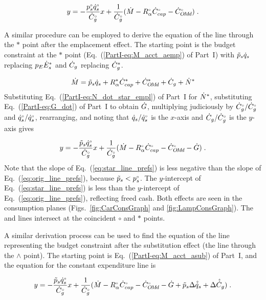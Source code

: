 \begin{equation} \label{eq:orig_line_prefs}
  y = - \frac{{}{p}^{\scriptscriptstyle \circ}_s {}{\dot{q}}^{\scriptscriptstyle \circ}_s}{{}{\dot{C}}^{\scriptscriptstyle \circ}_g} x
         + \frac{1}{{}{\dot{C}}^{\scriptscriptstyle \circ}_g} (\dot{M} - {}{R}^{\scriptscriptstyle \circ}_\alpha {}{\dot{C}}^{\scriptscriptstyle \circ}_{cap} - {}{\dot{C}}^{\scriptscriptstyle \circ}_{O\!M\!d}) \; .
\end{equation}

A similar procedure can be employed to derive the equation of the
\starstar{} line through the $*$ point
after the emplacement effect.
The starting point is the budget constraint at the $*$ point
(Eq.~(\ref{PartI-eq:M_acct_aemp}) of Part~I)
with 
$\tilde{p}_s \dot{q}_s$ replacing $p_E {\dot{E}}^*_s$ and
$\dot{C}_g$ replacing ${\dot{C}}^*_g$.

\begin{equation}
  \dot{M} = \tilde{p}_s \dot{q}_s + {R}^*_\alpha {\dot{C}}^*_{cap} + {\dot{C}}^*_{O\!M\!d} + \dot{C}_g + {\dot{N}}^*
\end{equation}
%
Substituting Eq.~(\ref{PartI-eq:N_dot_star_empl}) of Part~I for ${\dot{N}}^*$,
substituting Eq.~(\ref{PartI-eq:G_dot}) of Part~I to obtain $\dot{G}$,
multiplying judiciously by ${}{\dot{C}}^{\scriptscriptstyle \circ}_g/{}{\dot{C}}^{\scriptscriptstyle \circ}_g$ and ${}{\dot{q}}^{\scriptscriptstyle \circ}_s/{}{\dot{q}}^{\scriptscriptstyle \circ}_s$, 
rearranging, and noting that 
$\dot{q}_s/{}{\dot{q}}^{\scriptscriptstyle \circ}_s$ is the $x$-axis and 
$\dot{C}_g/{}{\dot{C}}^{\scriptscriptstyle \circ}_g$ is the $y$-axis gives

\begin{equation} \label{eq:star_line_prefs}
  y = - \frac{\tilde{p}_s {}{\dot{q}}^{\scriptscriptstyle \circ}_s}{{}{\dot{C}}^{\scriptscriptstyle \circ}_g} x
         + \frac{1}{{}{\dot{C}}^{\scriptscriptstyle \circ}_g} (\dot{M} - {}{R}^{\scriptscriptstyle \circ}_\alpha {}{\dot{C}}^{\scriptscriptstyle \circ}_{cap} - {}{\dot{C}}^{\scriptscriptstyle \circ}_{O\!M\!d} - \dot{G}) \; .
\end{equation}
%
Note that the slope of Eq.~(\ref{eq:star_line_prefs}) is less negative
than the slope of Eq.~(\ref{eq:orig_line_prefs}), 
because $\tilde{p}_s < {}{p}^{\scriptscriptstyle \circ}_s$.
The $y$-intercept of Eq.~(\ref{eq:star_line_prefs}) is less than the 
$y$-intercept of Eq.~(\ref{eq:orig_line_prefs}),
reflecting freed cash.
Both effects are seen in
the consumption planes
(Figs.~\ref{fig:CarConsGraph} and \ref{fig:LampConsGraph}).
The \circcirc{} and \starstar{} lines intersect at the coincident $\circ$ and $*$ points.

A similar derivation process can be used to find the equation of 
the line representing the budget constraint
after the substitution effect (the \hathat{} line through the $\wedge$ point).
The starting point is Eq.~(\ref{PartI-eq:M_acct_asub}) of Part~I, and 
the equation for the constant expenditure line is

\begin{equation} \label{eq:hat_line_prefs}
  y = - \frac{\tilde{p}_s {}{\dot{q}}^{\scriptscriptstyle \circ}_s}{{}{\dot{C}}^{\scriptscriptstyle \circ}_g} x
         + \frac{1}{{}{\dot{C}}^{\scriptscriptstyle \circ}_g} (\dot{M} - {}{R}^{\scriptscriptstyle \circ}_\alpha {}{\dot{C}}^{\scriptscriptstyle \circ}_{cap} - {}{\dot{C}}^{\scriptscriptstyle \circ}_{O\!M\!d} 
                                   - \dot{G} + \tilde{p}_s \Delta \hat{\dot{q}}_s + \Delta \hat{\dot{C}}_g) \; .
\end{equation}

